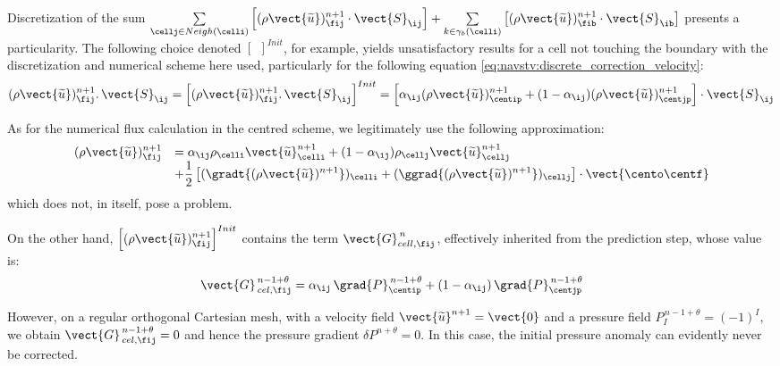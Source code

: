 Discretization of the sum $\sum\limits_{\cellj \in Neigh{(\celli)}}{\left[ (\rho
\vect{\widetilde{u}})^{n+1}_{\fij} \cdot \vect{S}_{\ij}\right]} +
\sum\limits_{k\in {\gamma_b(\celli)}} \left[{(\rho \vect{\widetilde{u}})^{n+1}_{\fib}} \cdot \vect{S}_{\ib}\right]$ presents a particularity. The following choice denoted $\left[{\ \ }\right]^{Init}$,
for example, yields unsatisfactory results for a cell not touching the boundary with the discretization and
numerical scheme here used, particularly for the following equation
\eqref{eq:navstv:discrete_correction_velocity}:
\begin{equation}
(\rho \vect{\widetilde{u}})^{n+1}_{\fij}.\,\vect{S}_{\ij}=
\left[(\rho \vect{\widetilde{u}})^{n+1}_{\fij}.\,\vect{S}_{\ij}\right]^{Init}=
\left[\alpha_{\ij} (\rho\vect{\widetilde{u}})^{n+1}_{\centip} +
(1-\alpha_{\ij}) (\rho\vect{\widetilde{u}})^{n+1}_{\centjp}\right] \cdot \vect{S}_{\ij}
\end{equation}

As for the numerical flux calculation in the centred scheme, we legitimately
use the following approximation:
\begin{equation}
\begin{array}{ll}
(\rho \vect{\widetilde{u}})^{n+1}_{\fij}&=
\alpha_{\ij} \rho_{\celli} \vect{\widetilde{u}}^{n+1}_{\celli} +
(1-\alpha_{\ij}) \rho_{\cellj} \vect{\widetilde{u}}^{n+1}_{\cellj}\\
&+\displaystyle \frac{1}{2}\left[(\gradt{(\rho\vect{\widetilde{u}})^{n+1}})_\celli
+ (\ggrad{(\rho\vect{\widetilde{u}})^{n+1}})_\cellj \right]\cdot \vect{\cento \centf}
\end{array}
\end{equation}
which does not, in itself, pose a problem.

On the other hand, $ \left[(\rho\vect{\widetilde{u}})^{n+1}_{\fij}\right]^{Init}$
contains the term $\vect{G}^{\,n}_{cell ,\fij}$, effectively inherited from the prediction step, whose value is:\\
\begin{equation*}
\vect{G}^{\,n-1+\theta}_{\,cel,\fij}=\alpha_{\ij}\, \grad{P}^{\,n-1+\theta}_{\centip} +
(1-\alpha_{\ij})\, \grad{P}^{\,n-1+\theta}_{\centjp}
\end{equation*}

However, on a regular orthogonal Cartesian mesh, with a velocity field
$\vect{\widetilde{u}}^{n+1}=\vect{0}$ and a pressure field $P^{\,n-1+\theta}_I=(-1)^{I}$,
we obtain $\vect{G}^{\,n-1+\theta}_{\,cel, \fij}=0$ and hence the pressure gradient
$\delta P^{n+\theta}=0$. In this case, the initial pressure anomaly can evidently
never be corrected.

